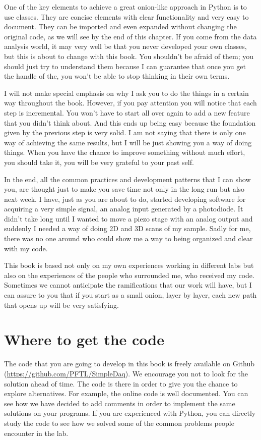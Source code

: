 One of the key elements to achieve a great onion-like approach in Python is to use classes. They are concise elements with clear functionality and very easy to document. They can be imported and even expanded without changing the original code, as we will see by the end of this chapter. If you come from the data analysis world, it may very well be that you never developed your own classes, but this is about to change with this book. You shouldn’t be afraid of them; you should just try to understand them because I can guarantee that once you get the handle of the, you won’t be able to stop thinking in their own terms.

I will not make special emphasis on why I ask you to do the things in a certain way throughout the book. However, if you pay attention you will notice that each step is incremental. You won’t have to start all over again to add a new feature that you didn’t think about. And this ends up being easy because the foundation given by the previous step is very solid. I am not saying that there is only one way of achieving the same results, but I will be just showing you a way of doing things. When you have the chance to improve something without much effort, you should take it, you will be very grateful to your past self.

In the end, all the common practices and development patterns that I can show you, are thought just to make you save time not only in the long run but also next week. I have, just as you are about to do, started developing software for acquiring a very simple signal, an analog input generated by a photodiode. It didn’t take long until I wanted to move a piezo stage with an analog output and suddenly I needed a way of doing 2D and 3D scans of my sample. Sadly for me, there was no one around who could show me a way to being organized and clear with my code.

This book is based not only on my own experiences working in different labs but also on the experiences of the people who surrounded me, who received my code. Sometimes we cannot anticipate the ramifications that our work will have, but I can assure to you that if you start as a small onion, layer by layer, each new path that opens up will be very satisfying. 

\section{Where to get the code}
The code that you are going to develop in this book is freely available on Github (\url{https://github.com/PFTL/SimpleDaq}). We encourage you not to look for the solution ahead of time. The code is there in order to give you the chance to explore alternatives. For example, the online code is well documented. You can see how we have decided to add comments in order to implement the same solutions on your programs. If you are experienced with Python, you can directly study the code to see how we solved some of the common problems people encounter in the lab. 

